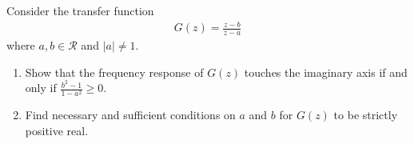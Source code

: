 \item
Consider the transfer function
\begin{align*}
    G(z) = \frac{z - b}{z - a}
\end{align*}
where $a,b \in \mathcal{R}$ and $|a| \neq 1$.

\begin{enumerate}
    \item
    Show that the frequency response of $G(z)$ touches the imaginary axis if and only if $\frac{b^2 - 1}{1 - a^2} \geq 0$.


    \item
    Find necessary and sufficient conditions on $a$ and $b$ for $G(z)$ to be strictly positive real.
\end{enumerate}
